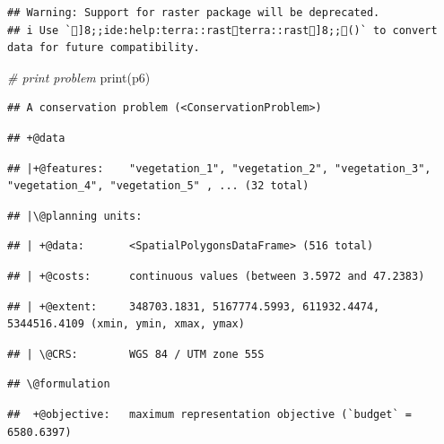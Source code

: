 \documentclass[
  12pt,
]{book}
\newenvironment{Shaded}{\begin{snugshade}}{\end{snugshade}}
\newcommand{\CommentTok}[1]{\textcolor[rgb]{0.56,0.35,0.01}{\textit{#1}}}
\newcommand{\FunctionTok}[1]{\textcolor[rgb]{0.00,0.00,0.00}{#1}}
\newcommand{\NormalTok}[1]{#1}
\begin{document}
\begin{verbatim}
## Warning: Support for raster package will be deprecated.
## i Use `]8;;ide:help:terra::rastterra::rast]8;;()` to convert data for future compatibility.
\end{verbatim}

\begin{Shaded}
\begin{Highlighting}[]
\CommentTok{\# print problem}
\FunctionTok{print}\NormalTok{(p6)}
\end{Highlighting}
\end{Shaded}

\begin{verbatim}
## A conservation problem (<ConservationProblem>)
\end{verbatim}

\begin{verbatim}
## +@data
\end{verbatim}

\begin{verbatim}
## |+@features:    "vegetation_1", "vegetation_2", "vegetation_3", "vegetation_4", "vegetation_5" , ... (32 total)
\end{verbatim}

\begin{verbatim}
## |\@planning units:
\end{verbatim}

\begin{verbatim}
## | +@data:       <SpatialPolygonsDataFrame> (516 total)
\end{verbatim}

\begin{verbatim}
## | +@costs:      continuous values (between 3.5972 and 47.2383)
\end{verbatim}

\begin{verbatim}
## | +@extent:     348703.1831, 5167774.5993, 611932.4474, 5344516.4109 (xmin, ymin, xmax, ymax)
\end{verbatim}

\begin{verbatim}
## | \@CRS:        WGS 84 / UTM zone 55S
\end{verbatim}

\begin{verbatim}
## \@formulation
\end{verbatim}

\begin{verbatim}
##  +@objective:   maximum representation objective (`budget` = 6580.6397)
\end{verbatim}
\end{document}
